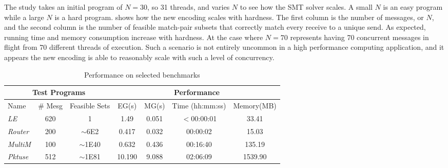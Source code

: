 The study takes an initial program of $N = 30$, so 31 threads, and varies $N$ to see how the SMT solver scales. A small $N$ is an easy program while a large $N$ is a hard program.  shows how the new encoding scales with hardness. The first column is the number of messages, or $N$, and the second column is the number of feasible match-pair subsets that correctly match every receive to a unique send. As expected, running time and memory consumption increase with hardness. At the case where $N=70$ represents having 70 concurrent messages in flight from 70 different threads of execution. Such a scenario is not entirely uncommon in a high performance computing application, and it appears the new encoding is able to reasonably scale with such a level of concurrency.

\begin{table}
\begin{center}
\setlength{\tabcolsep}{2pt}
\scriptsize
\caption{Performance on selected benchmarks}
\begin{tabular}{|l|c|c|c|c|c|c|}
		\hline
         \multicolumn{3}{|c|}{Test Programs} & \multicolumn{4}{|c|}{Performance} \\ \hline
         Name & \# Mesg & Feasible Sets & EG(s) & MG(s) & Time (hh:mm:ss) & Memory(MB) \\ \hline
         \textit{LE} & 620 & 1 & 1.49 & 0.051 & $<$00:00:01 & 33.41  \\ %
         \textit{Router} & 200 & $\sim$6E2 & 0.417 & 0.032 & 00:00:02 & 15.03  \\ %
         \textit{MultiM} & 100 & $\sim$1E40 & 0.632 & 0.436 &  00:16:40 & 135.19  \\ %
         \textit{Pktuse} & 512 & $\sim$1E81 & 10.190 & 9.088 & 02:06:09 & 1539.90 \\ %
         \hline
		\end{tabular}
\end{center}
\label{table:second}
\end{table}


